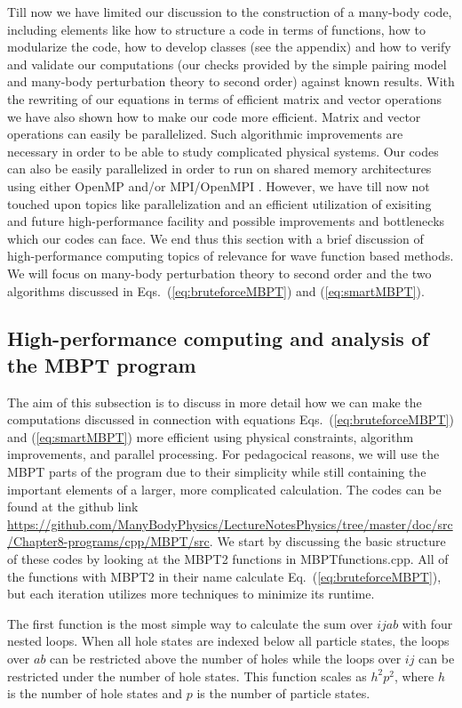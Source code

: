 Till now we have limited our discussion to the construction of a
many-body code, including elements like how to structure a code in
terms of functions, how to modularize the code, how to develop classes
(see the appendix) and how to verify and validate our computations
(our checks provided by the simple pairing model and many-body
perturbation theory to second order) against known results.  With the
rewriting of our equations in terms of efficient matrix and vector
operations we have also shown how to make our code more efficient.
Matrix and vector operations can easily be parallelized. Such
algorithmic improvements are necessary in order to be able to study
complicated physical systems.  Our codes can also be easily parallelized in order to run on shared memory architectures using either OpenMP \cite{openmp} and/or MPI/OpenMPI \cite{mpi,openmpi}.
However, we have till now not touched
upon topics like parallelization and an efficient utilization of exisiting and future
high-performance facility and possible improvements and bottlenecks which our codes can face. We end thus this section with a brief discussion
of high-performance computing topics of relevance for wave function based methods. We will focus on many-body perturbation theory to second order and the two algorithms discussed in Eqs.~(\ref{eq:bruteforceMBPT}) and (\ref{eq:smartMBPT}). 


\subsection{High-performance computing and analysis of the MBPT program}
The aim of this subsection is to discuss in more detail how we can make the computations discussed in connection with equations 
Eqs.~(\ref{eq:bruteforceMBPT}) and (\ref{eq:smartMBPT}) more efficient using physical constraints, algorithm improvements, and parallel processing. For pedagocical reasons, we will use the MBPT parts of the program due to their simplicity while still containing the important elements of a larger, more complicated calculation. 
The codes can be found at the github link 
\url{https://github.com/ManyBodyPhysics/LectureNotesPhysics/tree/master/doc/src/Chapter8-programs/cpp/MBPT/src}.
We start by discussing the basic structure of these codes by looking at the MBPT2 functions in MBPTfunctions.cpp.
All of the functions with MBPT2 in their name calculate Eq.~(\ref{eq:bruteforceMBPT}), but each iteration utilizes more techniques to minimize its runtime.

The first function is the most simple way to calculate the sum over $ijab$ with four nested loops. When all hole states are indexed below all particle states, the loops over $ab$ can be restricted above the number of holes while the loops over $ij$ can be restricted under the number of hole states. This function scales as $h^2p^2$, where $h$ is the number of hole states and $p$ is the number of particle states.


